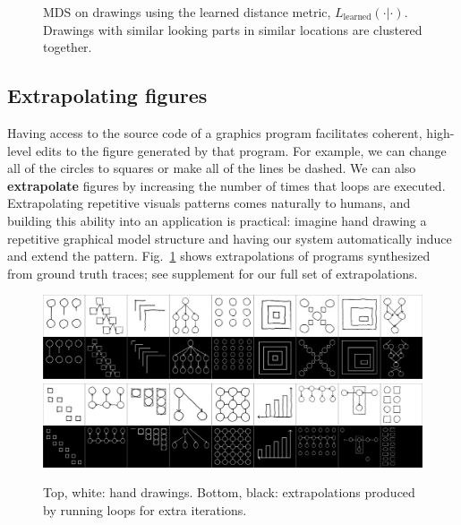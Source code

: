 \documentclass{article}
\newcommand{\remark}[1]{\textcolor{red}{[#1]}}
\begin{document}
\begin{figure}
\begin{minipage}{0.48\textwidth}
    \caption{MDS on drawings using the learned distance metric, $L_{\text{learned}}(\cdot|\cdot)$. Drawings with similar looking parts in similar locations are clustered together.}
  \end{minipage}
\end{figure}

\subsection{Extrapolating figures}
Having access to the source code of a graphics program facilitates coherent, high-level edits to the figure generated by that program. 
For example,
we can change all of the circles to squares or make all of the lines be dashed.
We can also \textbf{extrapolate} figures
by increasing the number of times that loops are executed.
Extrapolating repetitive visuals patterns comes naturally to humans,
and building this ability into an application is practical:
imagine hand drawing a repetitive graphical model structure
and having our system automatically induce and extend the pattern.
Fig.~\ref{extrapolationFigure} shows extrapolations of programs synthesized from ground truth traces;
see supplement for our full set of extrapolations.
 
\begin{figure}
  \includegraphics[width = \textwidth]{figures/extrapolationMatrix1.png}
    \includegraphics[width = \textwidth]{figures/extrapolationMatrix2.png}  
  \caption{Top, white: hand drawings. Bottom, black: extrapolations produced by
running loops for extra iterations.}\label{extrapolationFigure}
  \end{figure}
%



\end{document}
